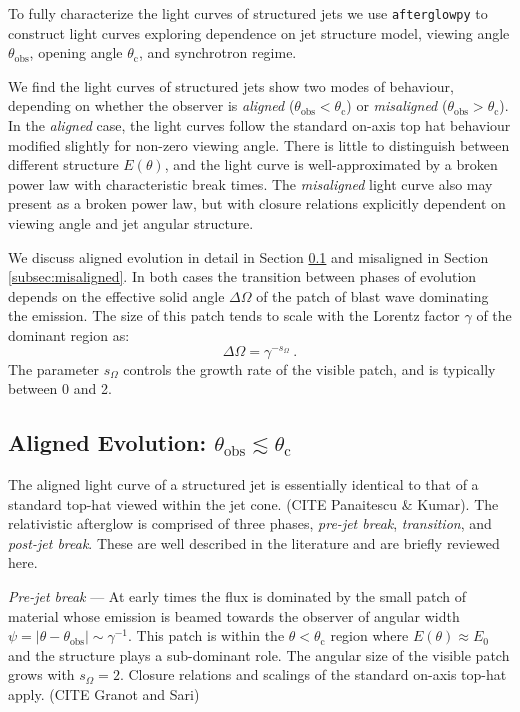 \documentclass[twocolumn]{aastex62}
\newcommand{\afterglowpy}{{\tt afterglowpy}}
\newcommand{\thobs}{\ensuremath{\theta_{\mathrm{obs}}}}
\newcommand{\thC}{\ensuremath{\theta_{\mathrm{c}}}}
\newcommand{\som}{\ensuremath{s_{\Omega}}}
\begin{document}
To fully characterize the light curves of structured jets we use \afterglowpy{} to construct light curves exploring dependence on jet structure model, viewing angle $\thobs$, opening angle $\thC$, and synchrotron regime.  

We find the light curves of structured jets show two modes of behaviour, depending on whether the observer is \emph{aligned} ($\thobs < \thC$) or \emph{misaligned} ($\thobs > \thC$). In the \emph{aligned} case, the light curves follow the standard on-axis top hat behaviour modified slightly for non-zero viewing angle.  There is little to distinguish between different structure $E(\theta)$, and the light curve is well-approximated by a broken power law with characteristic break times.  The \emph{misaligned} light curve also may present as a broken power law, but with closure relations explicitly dependent on viewing angle and jet angular structure.  

We discuss aligned evolution in detail in Section \ref{subsec:aligned} and misaligned in Section \ref{subsec:misaligned}.  In both cases the transition between phases of evolution depends on the effective solid angle $\Delta \Omega$ of the patch of blast wave dominating the emission.  The size of this patch tends to scale with the Lorentz factor $\gamma$ of the dominant region as:
\begin{equation}
	\Delta \Omega = \gamma^{-\som} \ .
\end{equation}
The parameter $\som$ controls the growth rate of the visible patch, and is typically between 0 and 2. 

\subsection{Aligned Evolution: $\thobs \lesssim \thC$} \label{subsec:aligned}

The aligned light curve of a structured jet is essentially identical to that of a standard top-hat viewed within the jet cone. (CITE Panaitescu \& Kumar).  The relativistic afterglow is comprised of three phases, \emph{pre-jet break}, \emph{transition}, and \emph{post-jet break}.  These are well described in the literature and are briefly reviewed here.

\emph{Pre-jet break} ---  At early times the flux is dominated by the small patch of material whose emission is beamed towards the observer of angular width $\psi = |\theta-\thobs| \sim \gamma^{-1}$.  This patch is within the $\theta < \thC$ region where $E(\theta) \approx E_0$ and the structure plays a sub-dominant role.  The angular size of the visible patch grows with $\som = 2$.  Closure relations and scalings of the standard on-axis top-hat apply. (CITE Granot and Sari)
\end{document}
